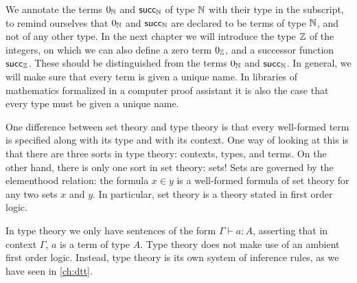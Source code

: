 \begin{rmk}
  We annotate the terms $0_\mathbb{N}$ and $\mathsf{succ}_\mathbb{N}$ of type $\mathbb{N}$ with their type in the subscript, to remind ourselves that $0_\mathbb{N}$ and $\mathsf{succ}_\mathbb{N}$ are declared to be terms of type $\mathbb{N}$, and not of any other type. In the next chapter we will introduce the type $\mathbb{Z}$ of the integers, on which we can also define a zero term $0_\mathbb{Z}$, and a successor function $\mathsf{succ}_\mathbb{Z}$. These should be distinguished from the terms $0_\mathbb{N}$ and $\mathsf{succ}_\mathbb{N}$. In general, we will make sure that every term is given a unique name. In libraries of mathematics formalized in a computer proof assistant it is also the case that every type must be given a unique name.
  
  One difference between set theory and type theory is that every well-formed term is specified along with its type and with its context. One way of looking at this is that there are three sorts in type theory: contexts, types, and terms. On the other hand, there is only one sort in set theory: sets! Sets are governed by the elementhood relation: the formula $x\in y$ is a well-formed formula of set theory for any two sets $x$ and $y$. In particular, set theory is a theory stated in first order logic.

  In type theory we only have sentences of the form $\Gamma \vdash a : A$, asserting that in context $\Gamma$, $a$ is a term of type $A$. Type theory does not make use of an ambient first order logic. Instead, type theory is its own system of inference rules, as we have seen in \cref{ch:dtt}.
\end{rmk}

